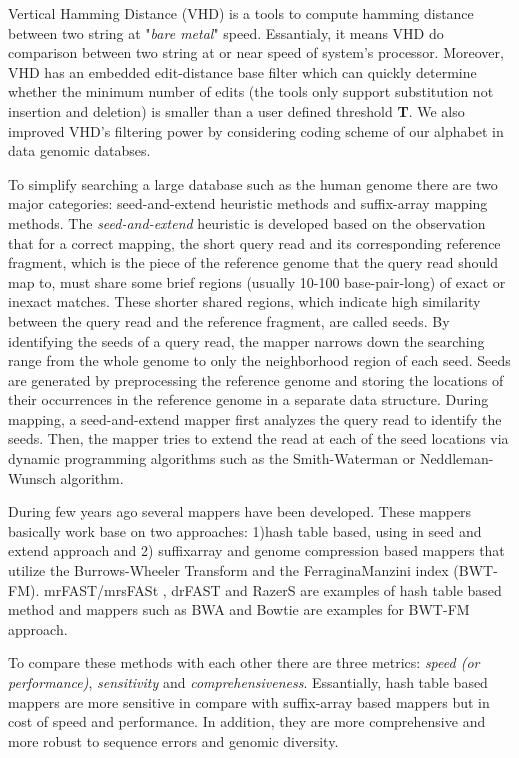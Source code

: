 Vertical Hamming Distance (VHD) is a tools to compute hamming distance between two string at "\textit{bare metal}" speed. Essantialy, it means VHD do comparison between two string at or near speed of system's processor. Moreover, VHD has an embedded edit-distance base filter which can quickly determine whether the minimum number of edits (the tools only support substitution not insertion and deletion) is smaller than a user defined threshold \textbf{T}. We also improved VHD's filtering power by considering coding scheme of our alphabet in data genomic databses.

To simplify searching a large database such as the human genome there are two major categories: seed-and-extend heuristic methods and suffix-array mapping methods. The \emph{seed-and-extend} heuristic is developed based on the observation that for a correct mapping, the short query read and its corresponding reference fragment, which is the piece of the reference genome that the query read should map to, must share some brief regions (usually 10-100 base-pair-long) of exact or inexact matches. These shorter shared regions, which indicate high similarity between the query read and the reference fragment, are called seeds. By identifying the seeds of a query read, the mapper narrows down the searching range from the whole genome to only the neighborhood region of each seed. Seeds are generated by preprocessing the reference genome and storing the locations of their occurrences in the reference genome in a separate data structure. During mapping, a seed-and-extend mapper first analyzes the query read to identify the seeds. Then, the mapper tries to extend the read at each of the seed locations via dynamic programming algorithms such as the Smith-Waterman \citep{smith1981identification} or Neddleman-Wunsch \citep{needleman} algorithm.

During few years ago several mappers have been developed. These mappers basically work base on two approaches: 1)hash table based, using in seed and extend approach and 2) suffixarray and genome compression based mappers that utilize the Burrows-Wheeler Transform and the FerraginaManzini index (BWT-FM).  mrFAST/mrsFASt \cite{mrfast}\cite{mrsfast}, drFAST\cite{drfast} and RazerS\cite{razers} are examples of hash table based method and mappers such as BWA\cite{bwa} and Bowtie\cite{bowtie} are examples for BWT-FM approach. 

To compare these  methods with each other there are three metrics: \emph{speed (or performance)}, \emph{sensitivity} and \emph{comprehensiveness}. Essantially, hash table based mappers are more sensitive in compare with suffix-array based mappers but in cost of speed and performance. In addition, they are more comprehensive and more robust to sequence errors and genomic diversity.

